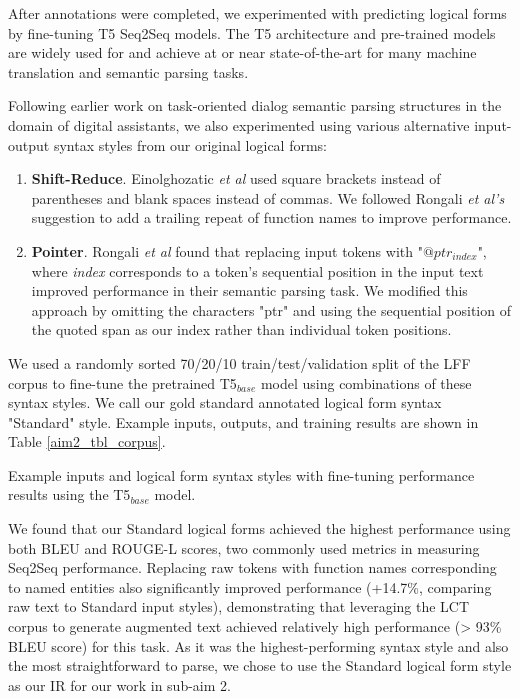 \documentclass[../main.tex]{subfiles}
\begin{document}
After annotations were completed, we experimented with predicting logical forms by fine-tuning T5 \cite{raffel2020exploring} Seq2Seq models. The T5 architecture and pre-trained models are widely used for and achieve at or near state-of-the-art for many machine translation and semantic parsing tasks. 

Following earlier work on task-oriented dialog semantic parsing structures in the domain of digital assistants, we also experimented using various alternative input-output syntax styles from our original logical forms:

\begin{enumerate}
    \item \textbf{Shift-Reduce}. Einolghozatic \textit{et al} \cite{einolghozati2019improving} used square brackets instead of parentheses and blank spaces instead of commas. We followed Rongali \textit{et al's} suggestion to add a trailing repeat of function names to improve performance.
    \item \textbf{Pointer}. Rongali \textit{et al} found that replacing input tokens with "$@ptr_{index}$", where \textit{index} corresponds to a token's sequential position in the input text improved performance in their semantic parsing task. We modified this approach by omitting the characters "ptr" and using the sequential position of the quoted span as our index rather than individual token positions.
\end{enumerate}

We used a randomly sorted 70/20/10 train/test/validation split of the LFF corpus to fine-tune the pretrained T5$_{base}$ model using combinations of these syntax styles. We call our gold standard annotated logical form syntax "Standard" style. Example inputs, outputs, and training results are shown in Table \ref{aim2_tbl_corpus}. 

\begin{table}[h!]
    \footnotesize
    \centering
    
    \caption{Example inputs and logical form syntax styles with fine-tuning performance results using the T5$_{base}$ model.}
    \label{aim2_tbl_corpus}
\end{table} 

We found that our Standard logical forms achieved the highest performance using both BLEU \cite{lin2004rouge} and ROUGE-L \cite{callison2006re} scores, two commonly used metrics in measuring Seq2Seq performance. Replacing raw tokens with function names corresponding to named entities also significantly improved performance (+14.7\%, comparing raw text to Standard input styles), demonstrating that leveraging the LCT corpus to generate augmented text achieved relatively high performance (> 93\% BLEU score) for this task. As it was the highest-performing syntax style and also the most straightforward to parse, we chose to use the Standard logical form style as our IR for our work in sub-aim 2.
\end{document}
